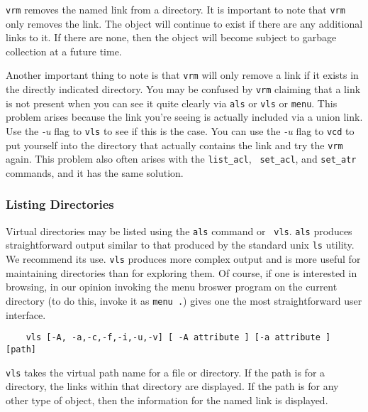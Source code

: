 {\tt vrm} removes the named link from a directory.  It is important to
note that {\tt vrm} only removes the link.  The object will continue
to exist if there are any additional links to it.  If there are none,
then the object will become subject to garbage collection at a future
time.

Another important thing to note is that {\tt vrm} will only remove a link
if it exists in the directly indicated directory.  You may be confused
by {\tt vrm} claiming that a link is not present when you can see it
quite clearly via {\tt als} or {\tt vls} or {\tt menu}.  This problem
arises because the link you're seeing is actually included via a union
link.  Use the {\em -u} flag to {\tt vls} to see if this is the case.
You can use the {\em -u} flag to {\tt vcd} to put yourself into the
directory that actually contains the link and try the {\tt vrm} again.
This problem also often arises with the {\tt list\_acl}, {\tt
set\_acl}, and {\tt set\_atr} commands, and it has the same solution.

\subsubsection{Listing Directories}

Virtual directories may be listed using the {\tt als} command or {\tt
vls}.  {\tt als} produces straightforward output similar to that
produced by the standard {\sc unix} {\tt ls} utility.  We recommend
its use.  {\tt vls} produces more complex output and is more useful
for maintaining directories than for exploring them.  Of course, if
one is interested in browsing, in our opinion invoking the menu
broswer program on the current directory (to do this, invoke it as
{\tt menu .}) gives one the most straightforward user interface.

\begin{verbatim}
    vls [-A, -a,-c,-f,-i,-u,-v] [ -A attribute ] [-a attribute ] [path]
\end{verbatim}

{\tt vls} takes the virtual path name for a file or directory.  If the
path is for a directory, the links within that directory are
displayed.  If the path is for any other type of object, then the
information for the named link is displayed.

